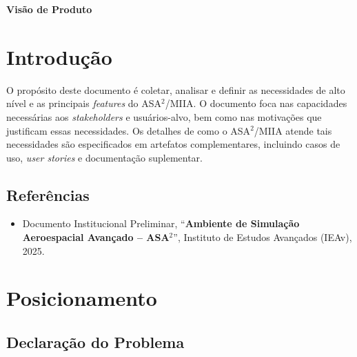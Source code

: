 \begin{center}
    \textbf{\Huge{Visão de Produto}}
\end{center}

\section{Introdução}

O propósito deste documento é coletar, analisar e definir as necessidades de alto nível e as principais \emph{features} do ASA$^{2}$/MIIA. O documento foca nas capacidades necessárias aos \emph{stakeholders} e usuários-alvo, bem como nas motivações que justificam essas necessidades. Os detalhes de como o ASA$^{2}$/MIIA atende tais necessidades são especificados em artefatos complementares, incluindo casos de uso, \emph{user stories} e documentação suplementar.

\subsection{Referências}

\begin{itemize}
    \item Documento Institucional Preliminar, ``\textbf{Ambiente de Simulação Aeroespacial Avançado -- ASA$^{2}$}'', Instituto de Estudos Avançados (IEAv), 2025.
\end{itemize}

\newpage

\section{Posicionamento}

\subsection{Declaração do Problema}

